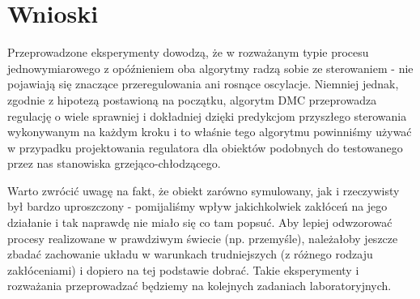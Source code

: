 \chapter{Wnioski}

Przeprowadzone eksperymenty dowodzą, że w rozważanym typie procesu jednowymiarowego z opóźnieniem oba algorytmy radzą sobie ze sterowaniem - nie pojawiają się znaczące przeregulowania ani rosnące oscylacje. Niemniej jednak, zgodnie z hipotezą postawioną na początku, algorytm DMC przeprowadza regulację o wiele sprawniej i dokładniej dzięki predykcjom przyszłego sterowania wykonywanym na każdym kroku i to właśnie tego algorytmu powinniśmy używać w przypadku projektowania regulatora dla obiektów podobnych do testowanego przez nas stanowiska grzejąco-chłodzącego.

Warto zwrócić uwagę na fakt, że obiekt zarówno symulowany, jak i rzeczywisty był bardzo uproszczony - pomijaliśmy wpływ jakichkolwiek zakłóceń na jego działanie i tak naprawdę nie miało się co tam popsuć. Aby lepiej odwzorować procesy realizowane w prawdziwym świecie (np. przemyśle), należałoby jeszcze zbadać zachowanie układu w warunkach trudniejszych (z różnego rodzaju zakłóceniami) i dopiero na tej podstawie dobrać. Takie eksperymenty i rozważania przeprowadzać będziemy na kolejnych zadaniach laboratoryjnych.